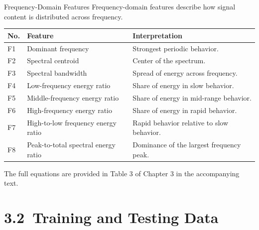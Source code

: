 \documentclass[aspectratio=169]{beamer}
\begin{document}
\begin{frame}{Frequency-Domain Features}
	Frequency-domain features describe how signal content is distributed across frequency.
	
	\vspace{0.4em}
	
	\begin{table}
		\centering
		\scriptsize
		\begin{tabular}{p{} p{} p{}}
			\hline
			\textbf{No.} & \textbf{Feature} & \textbf{Interpretation} \\
			\hline
			F1 & Dominant frequency & Strongest periodic behavior. \\
			F2 & Spectral centroid & Center of the spectrum. \\
			F3 & Spectral bandwidth & Spread of energy across frequency. \\
			F4 & Low-frequency energy ratio & Share of energy in slow behavior. \\
			F5 & Middle-frequency energy ratio & Share of energy in mid-range behavior. \\
			F6 & High-frequency energy ratio & Share of energy in rapid behavior. \\
			F7 & High-to-low frequency energy ratio & Rapid behavior relative to slow behavior. \\
			F8 & Peak-to-total spectral energy ratio & Dominance of the largest frequency peak. \\
			\hline
		\end{tabular}
	\end{table}
	
	\vspace{0.3em}
	
	{\scriptsize * The full equations are provided in Table 3 of Chapter 3 in the accompanying text.}
\end{frame}



\section{3.2~Training and Testing Data}
\end{document}
